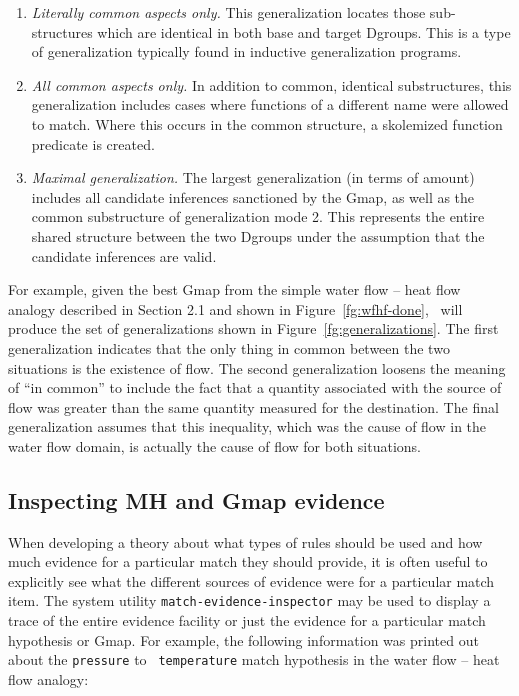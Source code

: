 \begin{enumerate}
 \item {\it Literally common aspects only.} This generalization locates
those sub-structures which are identical in both base and target Dgroups.
This is a type of generalization typically found in inductive generalization
programs.
 \item {\it All common aspects only.} In addition to common, identical
substructures, this generalization includes cases where functions of a
different name were allowed to match. Where this occurs in the common
structure, a skolemized function predicate is created.
 \item {\it Maximal generalization.} The largest generalization (in terms of
amount) includes all candidate inferences sanctioned by the Gmap, as well as
the common substructure of generalization mode 2. This represents the entire
shared structure between the two Dgroups under the assumption that the
candidate inferences are valid.
\end{enumerate}

For example, given the best Gmap from the simple water flow -- heat flow
analogy described in Section 2.1 and shown in Figure~\ref{fg:wfhf-done},
\SME\ will produce the set of generalizations shown in
Figure~\ref{fg:generalizations}. The first generalization indicates that the
only thing in common between the two situations is the existence of flow. The
second generalization loosens the meaning of ``in common'' to include the
fact that a quantity associated with the source of flow was greater than the
same quantity measured for the destination. The final generalization assumes
that this inequality, which was the cause of flow in the water flow domain,
is actually the cause of flow for both situations.


\subsection{Inspecting MH and Gmap evidence}\label{ss:inspecting-evidence}

\indent
{}

When developing a theory about what types of rules should be used and how
much evidence for a particular match they should provide, it is often useful
to explicitly see what the different sources of evidence were for a
particular match item. The system utility {\tt match-evidence-inspector} may
be used to display a trace of the entire evidence facility or just the
evidence for a particular match hypothesis or Gmap. For example, the
following information was printed out about the {\tt pressure} to {\tt
temperature} match hypothesis in the water flow -- heat flow analogy:

